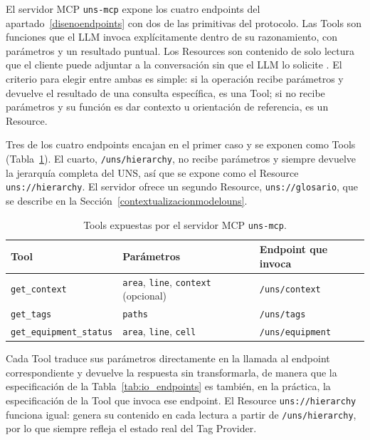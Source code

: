 El servidor MCP \texttt{uns-mcp} expone los cuatro endpoints del
apartado~\ref{disenoendpoints} con dos de las primitivas del protocolo. Las Tools son
funciones que el LLM invoca explícitamente dentro de su razonamiento, con parámetros y un
resultado puntual. Los Resources son contenido de solo lectura que el cliente puede adjuntar a
la conversación sin que el LLM lo solicite \cite{HouMCPLandscape2025}. El criterio para elegir entre ambas es simple: si
la operación recibe parámetros y devuelve el resultado de una consulta específica, es una
Tool; si no recibe parámetros y su función es dar contexto u orientación de referencia, es un
Resource.

Tres de los cuatro endpoints encajan en el primer caso y se exponen como Tools
(Tabla~\ref{tab:tools_mcp}). El cuarto, \texttt{/uns/hierarchy}, no recibe parámetros y
siempre devuelve la jerarquía completa del UNS, así que se expone como el Resource
\texttt{uns://hierarchy}. El servidor ofrece un segundo Resource, \texttt{uns://glosario},
que se describe en la Sección~\ref{contextualizacionmodelouns}.

\begin{table}[H]
\centering
\caption{Tools expuestas por el servidor MCP \texttt{uns-mcp}.}
\label{tab:tools_mcp}
\small
\renewcommand{\arraystretch}{1.4}
\begin{tabular}{@{}p{4.6cm}p{4.3cm}p{3.5cm}@{}}
\hline
\textbf{Tool} & \textbf{Parámetros} & \textbf{Endpoint que invoca} \\
\hline
\texttt{get\_context} & \texttt{area}, \texttt{line}, \texttt{context} (opcional) &
\texttt{/uns/context} \\
\texttt{get\_tags} & \texttt{paths} & \texttt{/uns/tags} \\
\texttt{get\_equipment\_status} & \texttt{area}, \texttt{line}, \texttt{cell} &
\texttt{/uns/equipment} \\
\hline
\end{tabular}
\end{table}

Cada Tool traduce sus parámetros directamente en la llamada al endpoint correspondiente y
devuelve la respuesta sin transformarla, de manera que la especificación de la
Tabla~\ref{tab:io_endpoints} es también, en la práctica, la especificación de la Tool que
invoca ese endpoint. El Resource \texttt{uns://hierarchy} funciona igual: genera su contenido
en cada lectura a partir de \texttt{/uns/hierarchy}, por lo que siempre refleja el estado
real del Tag Provider.

